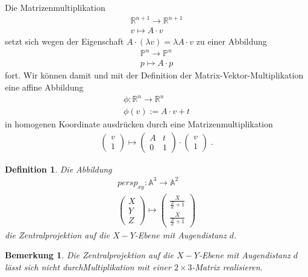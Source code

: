 \documentclass[]{article}
\newtheorem{Definition}{Definition}
\newtheorem{Bemerkung}{Bemerkung}
\begin{document}
Die Matrizenmultiplikation
\begin{align*}
\mathbb{R}^{n+1} \to \mathbb{R}^{n+1} \\
v \mapsto A \cdot v
\end{align*}
setzt sich wegen der Eigenschaft $A \cdot (\lambda v) = \lambda A \cdot v$ zu einer Abbildung
\begin{align*}
\mathbb{P}^{n} \to \mathbb{P}^{n} \\
p \mapsto A \cdot p
\end{align*}
fort. Wir können damit und mit der Definition der Matrix-Vektor-Multiplikation eine affine Abbildung 
\begin{align*}
\phi : \mathbb{R}^{n} \to \mathbb{R}^{n} \\
\phi(v):=  A \cdot v + t
\end{align*}
in homogenen Koordinate ausdrücken durch eine Matrizenmultiplikation
\begin{align*}
\begin{pmatrix} v \\ 1\end{pmatrix} \mapsto \begin{pmatrix}  A  & t  \\ 0 &1\end{pmatrix} \cdot  \begin{pmatrix} v \\ 1\end{pmatrix}   \; .
\end{align*}

\begin{Definition}
Die Abbildung 
\begin{align*}
persp_{xy} : \mathbb{A}^3 \to \mathbb{A}^2 \\
\begin{pmatrix}  X \\ Y \\ Z\end{pmatrix}  \mapsto \begin{pmatrix}  \frac{X}{\frac{Z}{d} +1 } \\   \frac{X}{\frac{Z}{d} +1 } \end{pmatrix}
\end{align*}
die Zentralprojektion auf die $X-Y$-Ebene mit Augendistanz $d$.
\end{Definition} 

\begin{Bemerkung}
Die Zentralprojektion auf die $X-Y$-Ebene mit Augendistanz $d$ lässt sich nicht durchMultiplikation mit einer  $2 \times 3$-Matrix realisieren.
\end{Bemerkung}
\end{document}
